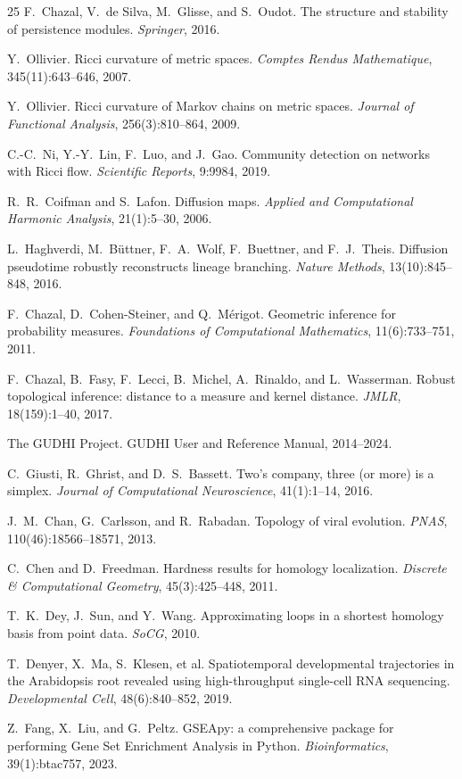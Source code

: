 \documentclass[11pt]{article}
\begin{document}
\begin{thebibliography}{25}
F.~Chazal, V.~de Silva, M.~Glisse, and S.~Oudot.
The structure and stability of persistence modules.
\emph{Springer}, 2016.

Y.~Ollivier.
Ricci curvature of metric spaces.
\emph{Comptes Rendus Mathematique}, 345(11):643--646, 2007.

Y.~Ollivier.
Ricci curvature of Markov chains on metric spaces.
\emph{Journal of Functional Analysis}, 256(3):810--864, 2009.

C.-C.~Ni, Y.-Y.~Lin, F.~Luo, and J.~Gao.
Community detection on networks with Ricci flow.
\emph{Scientific Reports}, 9:9984, 2019.

R.~R.~Coifman and S.~Lafon.
Diffusion maps.
\emph{Applied and Computational Harmonic Analysis}, 21(1):5--30, 2006.

L.~Haghverdi, M.~B\"uttner, F.~A.~Wolf, F.~Buettner, and F.~J.~Theis.
Diffusion pseudotime robustly reconstructs lineage branching.
\emph{Nature Methods}, 13(10):845--848, 2016.

F.~Chazal, D.~Cohen-Steiner, and Q.~M\'erigot.
Geometric inference for probability measures.
\emph{Foundations of Computational Mathematics}, 11(6):733--751, 2011.

F.~Chazal, B.~Fasy, F.~Lecci, B.~Michel, A.~Rinaldo, and L.~Wasserman.
Robust topological inference: distance to a measure and kernel distance.
\emph{JMLR}, 18(159):1--40, 2017.

The GUDHI Project.
GUDHI User and Reference Manual, 2014--2024.

C.~Giusti, R.~Ghrist, and D.~S.~Bassett.
Two's company, three (or more) is a simplex.
\emph{Journal of Computational Neuroscience}, 41(1):1--14, 2016.

J.~M.~Chan, G.~Carlsson, and R.~Rabadan.
Topology of viral evolution.
\emph{PNAS}, 110(46):18566--18571, 2013.

C.~Chen and D.~Freedman.
Hardness results for homology localization.
\emph{Discrete \& Computational Geometry}, 45(3):425--448, 2011.

T.~K.~Dey, J.~Sun, and Y.~Wang.
Approximating loops in a shortest homology basis from point data.
\emph{SoCG}, 2010.


T.~Denyer, X.~Ma, S.~Klesen, et al.
Spatiotemporal developmental trajectories in the Arabidopsis root revealed using high-throughput single-cell RNA sequencing.
\emph{Developmental Cell}, 48(6):840--852, 2019.

Z.~Fang, X.~Liu, and G.~Peltz.
GSEApy: a comprehensive package for performing Gene Set Enrichment Analysis in Python.
\emph{Bioinformatics}, 39(1):btac757, 2023.

\end{thebibliography}
\end{document}
